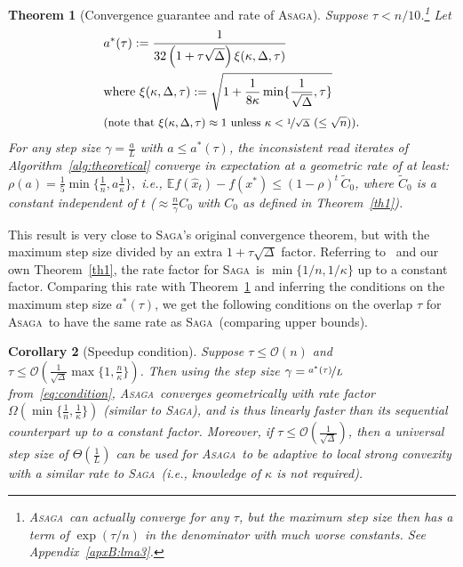\documentclass[twoside]{article}
\newcommand{\stepsize}{\gamma}
\newcommand{\overlap}{\tau}
\newcommand{\contraction}{\rho}
\newcommand{\sparsity}{\Delta}
\newcommand{\E}{\mathbb{E}}
\newcommand{\ASAGA}{\textsc{Asaga}}
\newcommand{\SAGA}{\textsc{Saga}}
\newtheorem{theorem}{Theorem}
\newtheorem{corollary}[theorem]{Corollary}
\begin{document}
\begin{theorem}[Convergence guarantee and rate of \ASAGA]\label{thm:convergence}
Suppose $\overlap < n/10$.\footnote{\ASAGA\ can actually converge for any $\overlap$, but the maximum step size then has a term of $\exp(\overlap/n)$ in the denominator with much worse constants. See Appendix~\ref{apxB:lma3}.} Let
\vspace{-1mm}
\begin{equation}\label{eq:condition}
\begin{aligned}
&a^*(\overlap) := \frac{1}{32 \left(1+ \overlap  \sqrt \sparsity \right) \xi(\kappa, \sparsity, \overlap)}
\\
&\text{where } \xi(\kappa, \sparsity, \overlap) := \sqrt{1 + \frac{1}{8 \kappa}  \min\{\frac{1}{\sqrt{\sparsity}}, \overlap\} } \\
&\text{\small{(note that $\xi(\kappa, \sparsity, \overlap) \approx 1$ unless $\kappa < \nicefrac{1}{\sqrt{\sparsity}}  \,\, (\leq \sqrt{n})$)}}.
\end{aligned}
\end{equation}
For any step size $\stepsize = \frac{a}{L}$ with $a \leq a^*(\overlap)$, the inconsistent read iterates of Algorithm~\ref{alg:theoretical} converge in expectation at a geometric rate of at least: $\contraction(a) = \frac{1}{5} \min \big\{\frac{1}{n},  a \frac{1}{\kappa}\big\},$
i.e., $\E f(\hat x_t)-f(x^*) \leq (1-\rho)^t \,  \tilde C_0$, where $\tilde C_0$ is a constant independent of $t$  ($\approx \frac{n}{\stepsize}C_0$ with $C_0$ as defined in Theorem~\ref{th1}).
\end{theorem}
\vspace{-2mm}
This result is very close to \SAGA's original convergence theorem, but with the maximum step size divided by an extra $1+ \overlap \sqrt{\sparsity}$ factor. Referring to~\citet{qsaga} and our own Theorem~\ref{th1}, the rate factor for \SAGA\ is $\min\{1/n, 1/\kappa\}$ up to a constant factor. Comparing this rate with Theorem~\ref{thm:convergence} and inferring the conditions on the maximum step size $a^*(\overlap)$, we get the following conditions on the overlap $\overlap$ for \ASAGA\ to have the same rate as \SAGA\ (comparing upper bounds).
\begin{corollary}[Speedup condition]\label{thm:bigdata}\label{thm:illcondition}
Suppose $\overlap \leq \mathcal{O}(n)$ and $\overlap \leq \mathcal{O}({\scriptstyle \frac{1}{\sqrt{\sparsity}}} \max\{1,\frac{n}{\kappa} \})$. Then using the step size $\stepsize = \nicefrac{a^*(\overlap)}{L}\,$ from~\eqref{eq:condition}, \ASAGA\ converges geometrically with rate factor $\Omega( \min\{\frac{1}{n}, \frac{1}{\kappa}\})$ (similar to \SAGA), and is thus linearly faster than its sequential counterpart up to a constant factor. Moreover, if $\overlap \leq \mathcal{O}(\frac{1}{\sqrt{\sparsity}})$, then a universal step size of $\Theta(\frac{1}{L})$ can be used for \ASAGA\ to be adaptive to local strong convexity with a similar rate to \SAGA\ (i.e., knowledge of $\kappa$ is not required).
\end{corollary}
\end{document}
